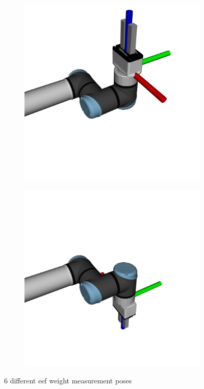 \begin{figure}[h]
\begin{subfigure}{.166\linewidth}
    \end{subfigure}%
    \begin{subfigure}{.166\linewidth}
        \centering
        \includegraphics[width=\linewidth]{figs/chp6/weight_z_pos.png}
    \end{subfigure}%
    \begin{subfigure}{.166\linewidth}
        \centering
        \includegraphics[width=\linewidth]{figs/chp6/weight_z_neg.png}
    \end{subfigure}
    \caption{6 different \ac{eef} weight measurement poses}
    \label{fig:weight_poses}
\end{figure}

